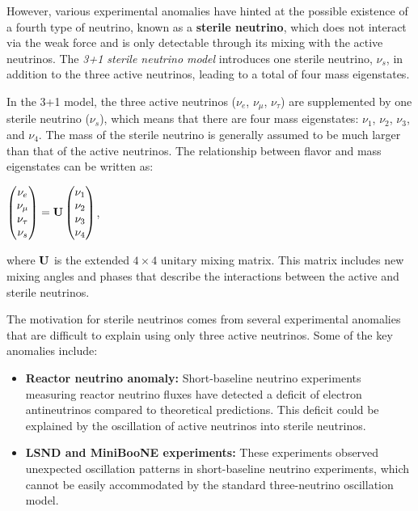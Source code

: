 \documentclass[a4paper,12pt,numbered]{article}
\begin{document}
However, various experimental anomalies have hinted at the possible existence of a fourth type of neutrino, known as a \textbf{sterile neutrino}, which does not interact via the weak force and is only detectable through its mixing with the active neutrinos. The \textit{3+1 sterile neutrino model} introduces one sterile neutrino, $\nu_s$, in addition to the three active neutrinos, leading to a total of four mass eigenstates.


In the 3+1 model, the three active neutrinos ($\nu_e$, $\nu_\mu$, $\nu_\tau$) are supplemented by one sterile neutrino ($\nu_s$), which means that there are four mass eigenstates: $\nu_1$, $\nu_2$, $\nu_3$, and $\nu_4$. The mass of the sterile neutrino is generally assumed to be much larger than that of the active neutrinos. The relationship between flavor and mass eigenstates can be written as:


$\begin{pmatrix}
\nu_e \\
\nu_\mu \\
\nu_\tau \\
\nu_s
\end{pmatrix}
=
\bold{U}
\begin{pmatrix}
\nu_1 \\
\nu_2 \\
\nu_3 \\
\nu_4
\end{pmatrix}$,

where $\bold{U}$ is the extended $4 \times 4$ unitary mixing matrix. This matrix includes new mixing angles and phases that describe the interactions between the active and sterile neutrinos.


The motivation for sterile neutrinos comes from several experimental anomalies that are difficult to explain using only three active neutrinos. Some of the key anomalies include:
\begin{itemize}
    \item \textbf{Reactor neutrino anomaly:} Short-baseline neutrino experiments measuring reactor neutrino fluxes have detected a deficit of electron antineutrinos compared to theoretical predictions. This deficit could be explained by the oscillation of active neutrinos into sterile neutrinos.
    \item \textbf{LSND and MiniBooNE experiments:} These experiments observed unexpected oscillation patterns in short-baseline neutrino experiments, which cannot be easily accommodated by the standard three-neutrino oscillation model.
\end{itemize}
\end{document}
